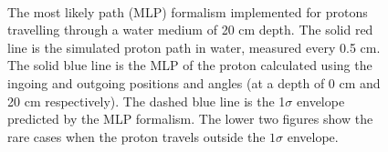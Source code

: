 \documentclass[11pt,a4paper]{article}
\begin{document}
\begin{figure}[!htb]
  \hspace*{\fill}%
  \hfill%
  \hspace*{\fill}\\
  
  \hspace*{\fill}%
  \hfill%
  \hspace*{\fill}
  \caption{The most likely path (MLP) formalism implemented for protons travelling through a water medium of 20 cm depth. The solid red line is the simulated proton path in water, measured every 0.5 cm. The solid blue line is the MLP of the proton calculated using the ingoing and outgoing positions and angles (at a depth of 0 cm and 20 cm respectively). The dashed blue line is the 1$\sigma$ envelope predicted by the MLP formalism. The lower two figures show the rare cases when the proton travels outside the $1\sigma$ envelope.}
\label{fig:mlp}
\end{figure}
\end{document}
